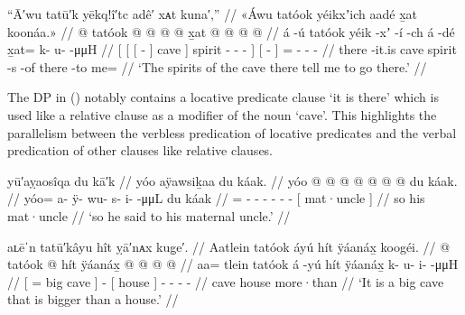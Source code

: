 \ex\label{ex:91-65-spirits-of-cave-there-order-me}%
%
\begingl
	\glpreamble	“Ā′wu tatū′k yēkq!î′tc adê′ xᴀt kuna′,” //
	\glpreamble	«\!Áwu tatóok yéikxʼich aadé x̱at koonáa.\!» //
	\gla	{} {} {}  @ {} {} tatóok {}  @ {} @ {} @ {} {}
		{}  @ {} {}
		x̱at @  @ {} @ {} @ {} //
	\glb	{} {} {} á -ú {} tatóok {} yéik -xʼ -í -ch {}
		{} á -dé {}
		x̱at= k- u-  -μμH //
	\glc	{}[ {}[ {}[  - {}] cave {}] spirit - - - {}]
		{}[  - {}]
		= - -  - //
	\gld	{} {} {} there -it.is {} cave {} spirit -s -of {} {}
		{} there -to {}
		me=  {} {} {}  //
	\glft	‘The spirits of the cave there tell me to go there.’
		//
\endgl
\xe

The DP  in (\lastx) notably contains a locative predicate clause  ‘it is there’ which is used like a relative clause as a modifier of the noun  ‘cave’.
This highlights the parallelism between the verbless predication of locative predicates and the verbal predication of other clauses like relative clauses.

\ex\label{ex:91-66-he-said-to-his-uncle}%
%
\begingl
	\glpreamble	yū′aỵaosîqa du kā′k //
	\glpreamble	yóo aÿawsiḵaa du káak. //
	\gla	yóo @  @ {} @ {} @ {} @ {} @ {} @ {}
		{} du káak. {} //
	\glb	yóo= a- ÿ- wu- s- i-  -μμL
		{} du káak {} //
	\glc	{}= - - - - -  -
		{}[  mat·uncle {}] //
	\gld	so  {} {} {} {} {} {}
		{} his mat·uncle {} //
	\glft	‘so he said to his maternal uncle.’
		//
\endgl
\xe

\ex\label{ex:91-67-bigger-than-a-house}%
%
\begingl
	\glpreamble	aʟēˈn tatū′kâyu hît ỵā′nᴀx kug̣e′. //
	\glpreamble	Aatlein tatóok áyú hít ÿáanáx̱ koogéi. //
	\gla	{}  @ {} tatóok {}  @ {}
		{} hít ÿáanáx̱ {}
		 @ {} @ {} @ {} @ {} //
	\glb	{} aa= tlein tatóok {} á -yú
		{} hít ÿáanáx̱ {}
		k- u- i-  -μμH //
	\glc	{}[ = big cave {}]  -
		{}[ house  {}]
		- - -  - //
	\gld	{}  {} cave {}  {}
		{} house more·than {}
		 {} {} {} {} //
	\glft	‘It is a big cave that is bigger than a house.’
		//
\endgl
\xe

